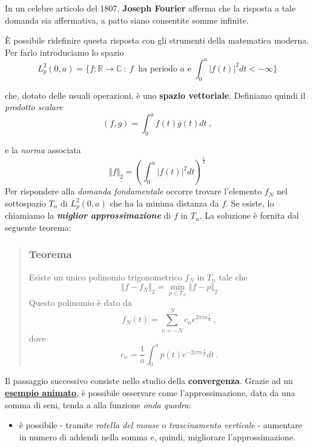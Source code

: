 \documentclass[
]{book}
\providecommand{\tightlist}{%
  \setlength{\itemsep}{0pt}\setlength{\parskip}{0pt}}
\begin{document}
In un celebre articolo del 1807, \textbf{Joseph Fourier} afferma che la risposta a tale domanda sia affermativa, a patto siano consentite somme infinite.

È possibile ridefinire questa risposta con gli strumenti della matematica moderna.
Per farlo introduciamo lo spazio
\[L_{p}^2(0,a)= \{ f:\mathbb{R} \longrightarrow \mathbb{C} \ : \ f \ \text{ ha periodo } a \text{ e } \int_{0}^{a}|f(t)|^2dt < -\infty\bigg\}\]

che, dotato delle usuali operazioni, è uno \textbf{spazio vettoriale}. Definiamo quindi il \emph{prodotto scalare}
\[(f,g) = \int_{0}^{a} f(t) \overline{g}(t)dt \ ,\]

e la \emph{norma} associata
\[ \Vert f \Vert_2 = \left( \int_{0}^{a} |f(t)|^2 dt \right) ^{\textstyle \frac{1}{2}}\]
Per rispondere alla \emph{domanda fondamentale} occorre trovare l'elemento \(f_N\) nel sottospazio \(T_n\) di \(L_{p}^{2}(0,a)\) che ha la minima distanza da \(f\). Se esiste, lo chiamiamo la \emph{\textbf{miglior approssimazione}} di \(f\) in \(T_{n}\).
La soluzione è fornita dal seguente teorema:

\begin{quote}
\hypertarget{teorema}{%
\subsubsection*{Teorema}\label{teorema}}

Esiste un unico polinomio trigonometrico \(f_N\) in \(T_n\) tale che
\[ \Vert f - f_N \Vert _{2} = \min_{p \in T_N} \Vert f - p \Vert _{2} \]
Questo polinomio è dato da
\begin{equation}
f_{N}(t)=\sum_{n=-N}^{N} c_{n}e^{2\pi in \textstyle \frac {t}{a}} \ ,
\label{eq:polsol}
\end{equation}
dove
\begin{equation}
c_n=\frac{1}{a} \int_{0}^{a}p(t)e^{-2 i \pi n \textstyle \frac {t}{a}}dt \ .
\label{eq:coeffsol}
\end{equation}
\end{quote}

Il passaggio successivo consiste nello studio della \textbf{convergenza}.
Grazie ad un \href{https://bradwave.github.io/thesis/animations/s4-animation.html}{\textbf{esempio animato}}, è possibile osservare come l'approssimazione, data da una somma di seni, tenda a alla funzione \emph{onda quadra}:

\begin{itemize}
\tightlist
\item
  è possibile - tramite \emph{rotella del mouse} o \emph{trascinamento verticale} - aumentare in numero di addendi nella somma e, quindi, migliorare l'approssimazione.
\end{itemize}
\end{document}
